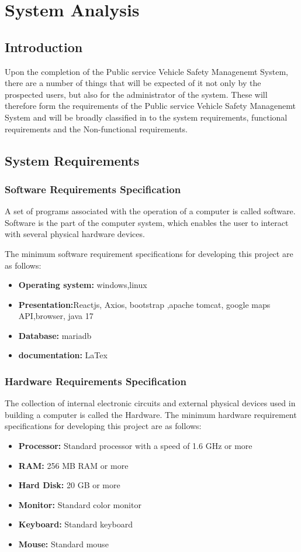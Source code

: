 \documentclass[a4paper, 12pt]{report}
\begin{document}
\chapter{System Analysis}
\section{Introduction}
Upon the completion of the Public service Vehicle Safety Managenemt System, there are a number of
things that will be expected of it not only by the prospected users, but also for the administrator
of the system. These will therefore form the requirements of the Public service Vehicle Safety Managenemt System and will be broadly classified in to the system requirements, functional
requirements and the Non-functional requirements.

\section{ System Requirements}
\subsection{Software Requirements Specification}
A set of programs associated with the operation of a computer is called software. Software is the
part of the computer system, which enables the user to interact with several physical hardware
devices.\par 
The minimum software requirement specifications for developing this project are as follows:
\begin{itemize}
\item \textbf{Operating system: }windows,linux
\item \textbf{Presentation:}Reactjs, Axios, bootstrap ,apache tomcat, google maps API,browser, java 17
\item \textbf{Database:} mariadb
\item \textbf{documentation: }LaTex

\end{itemize}
\subsection{Hardware Requirements Specification}
The collection of internal electronic circuits and external physical devices used in building a
computer is called the Hardware. The minimum hardware requirement specifications for
developing this project are as follows:
\begin{itemize}
\item \textbf{ Processor:} Standard processor with a speed of 1.6 GHz or more
\item \textbf{RAM:}  256 MB RAM or more
\item \textbf{Hard Disk:}  20 GB or more
\item \textbf{Monitor:}  Standard color monitor
\item \textbf{Keyboard:}  Standard keyboard
\item \textbf{Mouse:} Standard mouse
\end{itemize}
\end{document}
